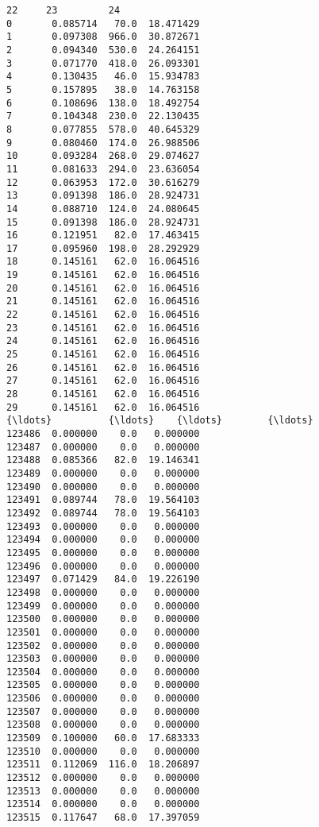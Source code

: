 \documentclass[11pt]{article}
\begin{document}
\begin{Verbatim}[commandchars=\\\{\}]
              22     23         24  
0       0.085714   70.0  18.471429  
1       0.097308  966.0  30.872671  
2       0.094340  530.0  24.264151  
3       0.071770  418.0  26.093301  
4       0.130435   46.0  15.934783  
5       0.157895   38.0  14.763158  
6       0.108696  138.0  18.492754  
7       0.104348  230.0  22.130435  
8       0.077855  578.0  40.645329  
9       0.080460  174.0  26.988506  
10      0.093284  268.0  29.074627  
11      0.081633  294.0  23.636054  
12      0.063953  172.0  30.616279  
13      0.091398  186.0  28.924731  
14      0.088710  124.0  24.080645  
15      0.091398  186.0  28.924731  
16      0.121951   82.0  17.463415  
17      0.095960  198.0  28.292929  
18      0.145161   62.0  16.064516  
19      0.145161   62.0  16.064516  
20      0.145161   62.0  16.064516  
21      0.145161   62.0  16.064516  
22      0.145161   62.0  16.064516  
23      0.145161   62.0  16.064516  
24      0.145161   62.0  16.064516  
25      0.145161   62.0  16.064516  
26      0.145161   62.0  16.064516  
27      0.145161   62.0  16.064516  
28      0.145161   62.0  16.064516  
29      0.145161   62.0  16.064516  
{\ldots}          {\ldots}    {\ldots}        {\ldots}  
123486  0.000000    0.0   0.000000  
123487  0.000000    0.0   0.000000  
123488  0.085366   82.0  19.146341  
123489  0.000000    0.0   0.000000  
123490  0.000000    0.0   0.000000  
123491  0.089744   78.0  19.564103  
123492  0.089744   78.0  19.564103  
123493  0.000000    0.0   0.000000  
123494  0.000000    0.0   0.000000  
123495  0.000000    0.0   0.000000  
123496  0.000000    0.0   0.000000  
123497  0.071429   84.0  19.226190  
123498  0.000000    0.0   0.000000  
123499  0.000000    0.0   0.000000  
123500  0.000000    0.0   0.000000  
123501  0.000000    0.0   0.000000  
123502  0.000000    0.0   0.000000  
123503  0.000000    0.0   0.000000  
123504  0.000000    0.0   0.000000  
123505  0.000000    0.0   0.000000  
123506  0.000000    0.0   0.000000  
123507  0.000000    0.0   0.000000  
123508  0.000000    0.0   0.000000  
123509  0.100000   60.0  17.683333  
123510  0.000000    0.0   0.000000  
123511  0.112069  116.0  18.206897  
123512  0.000000    0.0   0.000000  
123513  0.000000    0.0   0.000000  
123514  0.000000    0.0   0.000000  
123515  0.117647   68.0  17.397059  


\end{Verbatim}
\end{document}
